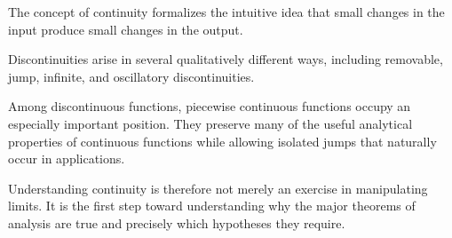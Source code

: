 \documentclass{essay}
\begin{document}
The concept of continuity formalizes the intuitive idea that small changes in
the input produce small changes in the output.

Discontinuities arise in several qualitatively different ways, including
removable, jump, infinite, and oscillatory discontinuities.

Among discontinuous functions, piecewise continuous functions occupy an
especially important position. They preserve many of the useful analytical
properties of continuous functions while allowing isolated jumps that naturally
occur in applications.

Understanding continuity is therefore not merely an exercise in manipulating
limits. It is the first step toward understanding why the major theorems of
analysis are true and precisely which hypotheses they require.
\end{document}
